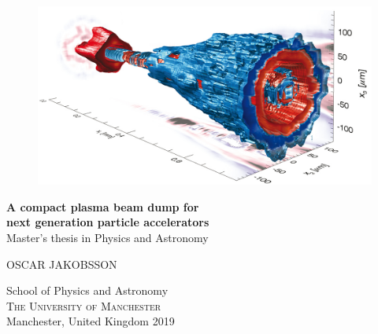 
\begin{titlepage}
			
\addtolength{\voffset}{2cm}

\begin{figure}[H]
\centering
\vspace{4cm}	%
\includegraphics[width=0.9\linewidth]{figure/test.png}
\end{figure}

\mbox{}
\vfill
\renewcommand{\familydefault}{\sfdefault} \normalfont %
\textbf{{\Huge 	A compact plasma beam dump for 	\\[0.2cm] 
				next generation particle accelerators}} 	\\[0.5cm]
Master's thesis in Physics and Astronomy \setlength{\parskip}{1cm}

{\Large OSCAR JAKOBSSON} \setlength{\parskip}{2.9cm}

School of Physics and Astronomy \\
\textsc{The University of Manchester} \\
Manchester, United Kingdom 2019

\renewcommand{\familydefault}{\rmdefault} \normalfont %
\end{titlepage}


\newpage
\restoregeometry
\thispagestyle{empty}
\mbox{}


